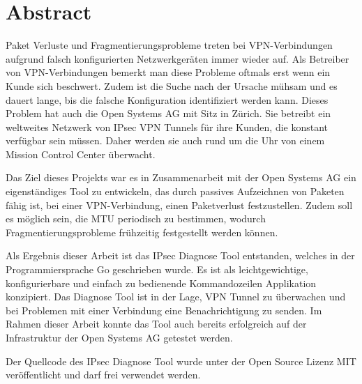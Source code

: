 
\chapter*{Abstract}

Paket Verluste und Fragmentierungsprobleme treten bei \ac{VPN}-Verbindungen aufgrund falsch konfigurierten Netzwerkgeräten immer wieder auf. Als Betreiber von \ac{VPN}-Verbindungen bemerkt man diese Probleme oftmals erst wenn ein Kunde sich beschwert. Zudem ist die Suche nach der Ursache mühsam und es dauert lange, bis die falsche Konfiguration identifiziert werden kann.
Dieses Problem hat auch die Open Systems AG mit Sitz in Zürich. Sie betreibt ein weltweites Netzwerk von \ac{IPsec} \ac{VPN} Tunnels für ihre Kunden, die konstant verfügbar sein müssen. Daher werden sie auch rund um die Uhr von einem Mission Control Center überwacht.

Das Ziel dieses Projekts war es in Zusammenarbeit mit der Open Systems AG ein eigenständiges Tool zu entwickeln, das durch passives Aufzeichnen von Paketen fähig ist, bei einer \ac{VPN}-Verbindung, einen Paketverlust festzustellen.
Zudem soll es möglich sein, die \ac{MTU} periodisch zu bestimmen, wodurch Fragmentierungsprobleme frühzeitig festgestellt werden können.

Als Ergebnis dieser Arbeit ist das \ac{IPsec} Diagnose Tool entstanden, welches in der Programmiersprache Go geschrieben wurde. Es ist als leichtgewichtige, konfigurierbare und einfach zu bedienende Kommandozeilen Applikation konzipiert. Das Diagnose Tool ist in der Lage, \ac{VPN} Tunnel zu überwachen und bei Problemen mit einer Verbindung eine Benachrichtigung zu senden. Im Rahmen dieser Arbeit konnte das Tool auch bereits erfolgreich auf der Infrastruktur der Open Systems AG getestet werden.

Der Quellcode des \ac{IPsec} Diagnose Tool wurde unter der Open Source Lizenz MIT veröffentlicht und darf frei verwendet werden.